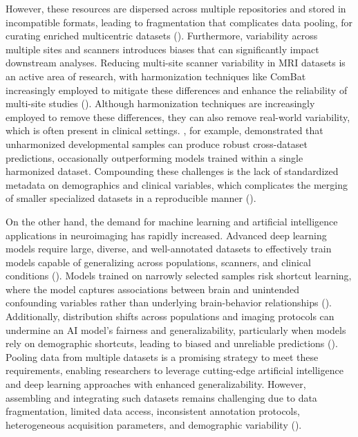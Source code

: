 However, these resources are dispersed across multiple repositories and stored in incompatible formats, 
leading to fragmentation that complicates data pooling, for curating enriched multicentric datasets (\cite{dishner2024survey}). 
Furthermore, variability across multiple sites and scanners introduces biases that can significantly 
impact downstream analyses. 
Reducing multi-site scanner variability in MRI datasets is an active area of research, 
with harmonization techniques like ComBat increasingly employed to mitigate these differences 
and enhance the reliability of multi-site studies (\cite{fortin2017harmonization, fortin2018harmonization}).
Although harmonization techniques are increasingly employed to remove these differences, 
they can also remove real-world variability, which is often present in clinical settings. 
\cite{adkinson2024brain}, for example, demonstrated that unharmonized developmental samples 
can produce robust cross-dataset predictions, occasionally outperforming models trained 
within a single harmonized dataset. 
Compounding these challenges is the lack of standardized metadata on demographics and clinical variables, 
which complicates the merging of smaller specialized datasets in a reproducible manner (\cite{pomponio2019harmonization}).



On the other hand, the demand for machine learning and artificial intelligence applications in neuroimaging has rapidly increased. 
Advanced deep learning models require large, diverse, and well-annotated datasets to effectively train models capable of generalizing across populations, 
scanners, and clinical conditions (\cite{dishner2024survey}). 
Models trained on narrowly selected samples risk shortcut learning, 
where the model captures associations between brain and unintended confounding 
variables rather than underlying brain-behavior relationships (\cite{marek2024replicability, yang2024limits}). 
Additionally, distribution shifts across populations and imaging protocols can undermine an AI model's 
fairness and generalizability, particularly when models rely on demographic shortcuts, 
leading to biased and unreliable predictions (\cite{yang2024limits}). 
Pooling data from multiple datasets is a promising strategy to meet these requirements, 
enabling researchers to leverage cutting-edge artificial intelligence and deep learning approaches with enhanced generalizability.
However, assembling and integrating such datasets remains challenging due to data fragmentation, 
limited data access, inconsistent annotation protocols, heterogeneous acquisition parameters, 
and demographic variability (\cite{goldfarb2022ai, pomponio2019harmonization}).

